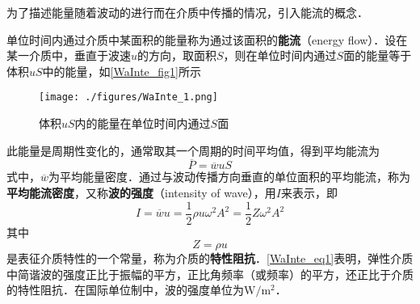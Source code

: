 

为了描述能量随着波动的进行而在介质中传播的情况，引入能流的概念．

单位时间内通过介质中某面积的能量称为通过该面积的\textbf{能流}（energy flow）．设在某一介质中，垂直于波速$u$的方向，取面积$S$，则在单位时间内通过$S$面的能量等于体积$uS$中的能量，如\autoref{WaInte_fig1}所示
\begin{figure}[ht]
\centering
\texttt{[image: ./figures/WaInte\_1.png]}
\caption{体积$uS$内的能量在单位时间内通过$S$面} \label{WaInte_fig1}
\end{figure}

此能量是周期性变化的，通常取其一个周期的时间平均值，得到平均能流为
\begin{equation}
\overline{P}=\overline{w} u S
\end{equation}
式中，$\overline w$为平均能量密度．通过与波动传播方向垂直的单位面积的平均能流，称为\textbf{平均能流密度}，又称\textbf{波的强度}（intensity of wave），用$I$来表示，即
\begin{equation} \label{WaInte_eq1}
I=\overline{w} u=\frac{1}{2} \rho u \omega^{2} A^{2}=\frac{1}{2} Z \omega^{2} A^{2}
\end{equation}
其中
\begin{equation}
Z=\rho u
\end{equation}
是表征介质特性的一个常量，称为介质的\textbf{特性阻抗}．\autoref{WaInte_eq1}表明，弹性介质中简谐波的强度正比于振幅的平方，正比角频率（或频率）的平方，还正比于介质的特性阻抗．在国际单位制中，波的强度单位为$\mathrm{W}/\mathrm{m^2}$．
